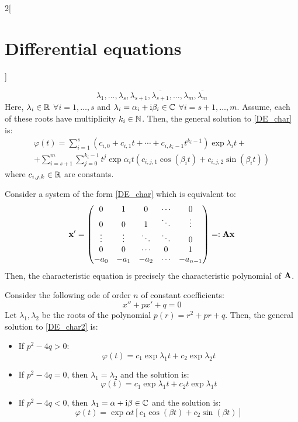 \documentclass[../../../main_math.tex]{subfiles}
\begin{document}
\begin{multicols}{2}[\section{Differential equations}]
\begin{method}
    $$\lambda_1,\ldots,\lambda_s,\lambda_{s+1},\overline{\lambda_{s+1}},\ldots,\lambda_{m},\overline{\lambda_m}$$
    Here, $\lambda_i\in\mathbb{R}$ $\forall i=1,\ldots,s$ and $\lambda_{i}=\alpha_i+\mathrm{i}\beta_i\in\mathbb{C}$ $\forall i=s+1,\ldots,m$. Assume, each of these roots have multiplicity $k_i\in\mathbb{N}$. Then, the general solution to \cref{DE_char} is:
    \begin{multline*}
      \varphi(t)=\sum_{i=1}^s\left(c_{i,0}+c_{i,1}t+\cdots+c_{i,k_i-1}t^{k_i-1}\right)\exp{\lambda_i t}+\\
      +\sum_{i=s+1}^m\sum_{j=0}^{k_i-1}t^{j}\exp{\alpha_i t}\left(c_{i,j,1}\cos(\beta_i t)+c_{i,j,2}\sin(\beta_i t)\right)
    \end{multline*}
    where $c_{i,j,k}\in\mathbb{R}$ are constants.
  \end{method}
  \begin{proposition}
    Consider a system of the form \cref{DE_char} which is equivalent to: $$\boldsymbol{\mathrm{x}}'=
      \begin{pmatrix}
        0      & 1      & 0      & \cdots & 0        \\
        0      & 0      & 1      & \ddots & \vdots   \\
        \vdots & \vdots & \ddots & \ddots & 0        \\
        0      & 0      & \cdots & 0      & 1        \\
        -a_0   & -a_1   & -a_2   & \cdots & -a_{n-1}
      \end{pmatrix}
      =:\boldsymbol{\mathrm{Ax}}$$
    Then, the characteristic equation is precisely the characteristic polynomial of $\boldsymbol{\mathrm{A}}$.
  \end{proposition}
  \begin{corollary}
    Consider the following ode of order $n$ of constant coefficients:
    \begin{equation}\label{DE_char2}
      x'' + px' + q = 0
    \end{equation}
    Let $\lambda_1,\lambda_2$ be the roots of the polynomial $p(r)=r^2+pr+q$.
    Then, the general solution to \cref{DE_char2} is:
    \begin{itemize}
      \item If $p^2-4q>0$: $$\varphi(t)=c_1\exp{\lambda_1t}+c_2\exp{\lambda_2t}$$
      \item If $p^2-4q=0$, then $\lambda_1=\lambda_2$ and the solution is: $$\varphi(t)=c_1\exp{\lambda_1t}+c_2t\exp{\lambda_1t}$$
      \item If $p^2-4q<0$, then $\lambda_1=\alpha+\mathrm{i}\beta\in\mathbb{C}$ and the solution is: $$\varphi(t)=\exp{\alpha t}\left[c_1\cos(\beta t)+c_2\sin(\beta t)\right]$$

\end{itemize}
\end{corollary}
\end{multicols}
\end{document}
